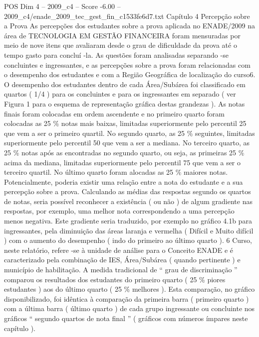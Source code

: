 \begin{textsample}{POS Dim 4 – 2009\_c4 – Score -6.00 – 2009\_c4/enade\_2009\_tec\_gest\_fin\_c1533fe6d7.txt}  \label{ex:f4_pos_337}
Capítulo 4 Percepção sobre a Prova As percepções dos estudantes sobre a prova aplicada no ENADE/2009 na área de TECNOLOGIA EM GESTÃO FINANCEIRA foram mensuradas por meio de nove itens que avaliaram desde o grau de dificuldade da prova até o tempo gasto para concluí -la.
As questões foram analisadas separando -se concluintes e ingressantes, e as percepções sobre a prova foram relacionadas com o desempenho dos estudantes e com a Região Geográfica de localização do curso6.
O desempenho dos estudantes dentro de cada Área/Subárea foi classificado em quartos ( 1/4 ) para os concluintes e para os ingressantes em separado ( ver Figura 1 para o esquema de representação gráfica destas grandezas ).
As notas finais foram colocadas em ordem ascendente e no primeiro quarto foram colocadas as 25 \% notas mais baixas, limitadas superiormente pelo percentil 25 que vem a ser o primeiro quartil.
No segundo quarto, as 25 \% seguintes, limitadas superiormente pelo percentil 50 que vem a ser a mediana.
No terceiro quarto, as 25 \% notas após as encontradas no segundo quarto, ou seja, as primeiras 25 \% acima da mediana, limitadas superiormente pelo percentil 75 que vem a ser o terceiro quartil.
No último quarto foram alocadas as 25 \% maiores notas.
Potencialmente, poderia existir uma relação entre a nota do estudante e a sua percepção sobre a prova.
Calculando as médias das respostas segundo os quartos de notas, seria possível reconhecer a existência ( ou não ) de algum gradiente nas respostas, por exemplo, uma melhor nota correspondendo a uma percepção menos negativa.
Este gradiente seria traduzido, por exemplo no gráfico 4.1b para ingressantes, pela diminuição das áreas laranja e vermelha ( Difícil e Muito difícil ) com o aumento do desempenho ( indo do primeiro ao último quarto ). 6 Curso, neste relatório, refere -se à unidade de análise para o Conceito ENADE e é caracterizado pela combinação de IES, Área/Subárea ( quando pertinente ) e município de habilitação.
A medida tradicional de “ grau de discriminação ” comparou os resultados dos estudantes do primeiro quarto ( 25 \% piores estudantes ) aos do último quarto ( 25 \% melhores ).
Esta comparação, no gráfico disponibilizado, foi idêntica à comparação da primeira barra ( primeiro quarto ) com a última barra ( último quarto ) de cada grupo ingressante ou concluinte nos gráficos “ segundo quartos de nota final ” ( gráficos com números ímpares neste capítulo ).

\end{textsample}

